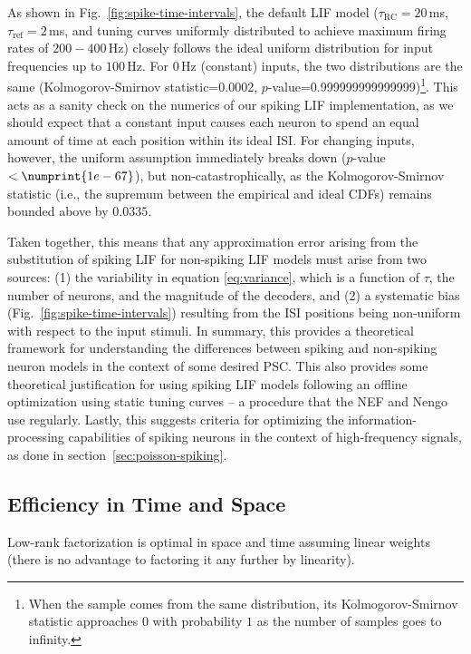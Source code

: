 As shown in Fig.~\ref{fig:spike-time-intervals}, the default LIF model ($\tau_\text{RC} = 20$\,ms, $\tau_\text{ref} = 2$\,ms, and tuning curves uniformly distributed to achieve maximum firing rates of $200-400$\,Hz) closely follows the ideal uniform distribution for input frequencies up to $100$\,Hz. For $0$\,Hz (constant) inputs, the two distributions are the same (Kolmogorov-Smirnov statistic=0.0002, $p$-value=0.999999999999999)\footnote{When the sample comes from the same distribution, its Kolmogorov-Smirnov statistic approaches $0$ with probability $1$ as the number of samples goes to infinity.}.
This acts as a sanity check on the numerics of our spiking LIF implementation, as we should expect that a constant input causes each neuron to spend an equal amount of time at each position within its ideal ISI.
For changing inputs, however, the uniform assumption immediately breaks down ($p$-value $< \numprint{1e-67}$), but non-catastrophically, as the Kolmogorov-Smirnov statistic (i.e., the supremum between the empirical and ideal CDFs) remains bounded above by $0.0335$.

Taken together, this means that any approximation error arising from the substitution of spiking LIF for non-spiking LIF models must arise from two sources: (1) the variability in equation \ref{eq:variance}, which is a function of $\tau$, the number of neurons, and the magnitude of the decoders, and (2) a systematic bias (Fig.~\ref{fig:spike-time-intervals}) resulting from the ISI positions being non-uniform with respect to the input stimuli.
In summary, this provides a theoretical framework for understanding the differences between spiking and non-spiking neuron models in the context of some desired PSC.
This also provides some theoretical justification for using spiking LIF models following an offline optimization using static tuning curves -- a procedure that the NEF and Nengo use regularly.
Lastly, this suggests criteria for optimizing the information-processing capabilities of spiking neurons in the context of high-frequency signals, as done in section~\ref{sec:poisson-spiking}.


\subsection{Efficiency in Time and Space}

Low-rank factorization is optimal in space and time assuming linear weights (there is no advantage to factoring it any further by linearity).


